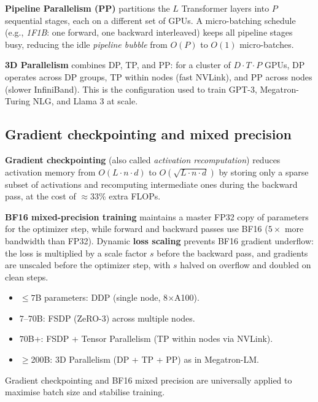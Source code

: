 \documentclass[11pt,a4paper]{article}
\begin{document}
	\textbf{Pipeline Parallelism (PP)} partitions the $L$ Transformer layers into $P$ sequential stages, each on a different set of GPUs. A micro-batching schedule (e.g., \emph{1F1B}: one forward, one backward interleaved) keeps all pipeline stages busy, reducing the idle \emph{pipeline bubble} from $O(P)$ to $O(1)$ micro-batches.

	\textbf{3D Parallelism} combines DP, TP, and PP: for a cluster of $D \cdot T \cdot P$ GPUs, DP operates across DP groups, TP within nodes (fast NVLink), and PP across nodes (slower InfiniBand). This is the configuration used to train GPT-3, Megatron-Turing NLG, and Llama 3 at scale.

	\subsection{Gradient checkpointing and mixed precision}

	\textbf{Gradient checkpointing} (also called \emph{activation recomputation}) reduces activation memory from $O(L \cdot n \cdot d)$ to $O(\sqrt{L \cdot n \cdot d})$ by storing only a sparse subset of activations and recomputing intermediate ones during the backward pass, at the cost of $\approx$33\% extra FLOPs.

	\textbf{BF16 mixed-precision training} maintains a master FP32 copy of parameters for the optimizer step, while forward and backward passes use BF16 ($5\times$ more bandwidth than FP32). Dynamic \textbf{loss scaling} prevents BF16 gradient underflow: the loss is multiplied by a scale factor $s$ before the backward pass, and gradients are unscaled before the optimizer step, with $s$ halved on overflow and doubled on clean steps.

	\begin{keyconcept}
		\begin{itemize}[nosep]
			\item $\le 7$B parameters: DDP (single node, 8$\times$A100).
			\item $7$--$70$B: FSDP (ZeRO-3) across multiple nodes.
			\item $70$B+: FSDP + Tensor Parallelism (TP within nodes via NVLink).
			\item $\ge$200B: 3D Parallelism (DP + TP + PP) as in Megatron-LM.
		\end{itemize}
		Gradient checkpointing and BF16 mixed precision are universally applied to maximise batch size and stabilise training.
	\end{keyconcept}
\end{document}

